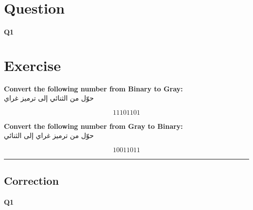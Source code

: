 
\section{Question}


\paragraph{Q1}







\section*{Exercise}

\textbf{Convert the following number from Binary to Gray:}\\
حوّل من الثنائي إلى ترميز غراي

\[
  11101101
\]

\bigskip

\textbf{Convert the following number from Gray to Binary:}\\
حوّل من ترميز غراي إلى الثنائي

\[
  10011011
\]




\hrule width 1\linewidth
\pagebreak

\subsection{Correction}


\paragraph{Q1}




